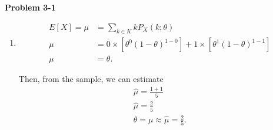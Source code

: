 \documentclass{article}
\begin{document}
\textbf{Problem 3-1}
\begin{enumerate}[label={(5.2.23)}]
    \item 
    \begin{align}
        E[X] = \mu & = \sum_{k \in K} kP_X(k;\theta) \nonumber \\
        \mu & = 0 \times \left[\theta^0(1-\theta)^{1-0}\right] + 1 \times \left[\theta^1(1-\theta)^{1-1}\right] \nonumber \\
        \mu & = \theta. \nonumber
    \end{align}

    Then, from the sample, we can estimate 
    \begin{align}
        \hat{\mu} = \frac{1+1}{5} \nonumber \\
        \hat{\mu} = \frac{2}{5} \nonumber \\
        \theta = \mu \approx \hat{\mu}  = \frac{2}{5}.\nonumber \\
    \end{align}
\end{enumerate}
\bigbreak
\end{document}
